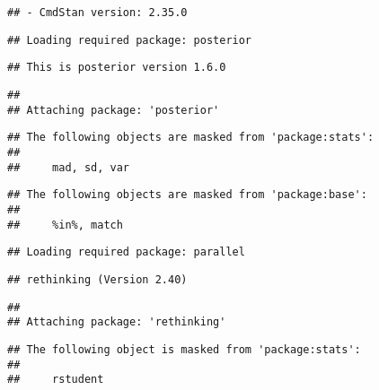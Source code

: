 \documentclass[
]{article}
\begin{document}
\begin{verbatim}
## - CmdStan version: 2.35.0
\end{verbatim}

\begin{verbatim}
## Loading required package: posterior
\end{verbatim}

\begin{verbatim}
## This is posterior version 1.6.0
\end{verbatim}

\begin{verbatim}
## 
## Attaching package: 'posterior'
\end{verbatim}

\begin{verbatim}
## The following objects are masked from 'package:stats':
## 
##     mad, sd, var
\end{verbatim}

\begin{verbatim}
## The following objects are masked from 'package:base':
## 
##     %in%, match
\end{verbatim}

\begin{verbatim}
## Loading required package: parallel
\end{verbatim}

\begin{verbatim}
## rethinking (Version 2.40)
\end{verbatim}

\begin{verbatim}
## 
## Attaching package: 'rethinking'
\end{verbatim}

\begin{verbatim}
## The following object is masked from 'package:stats':
## 
##     rstudent
\end{verbatim}
\end{document}
